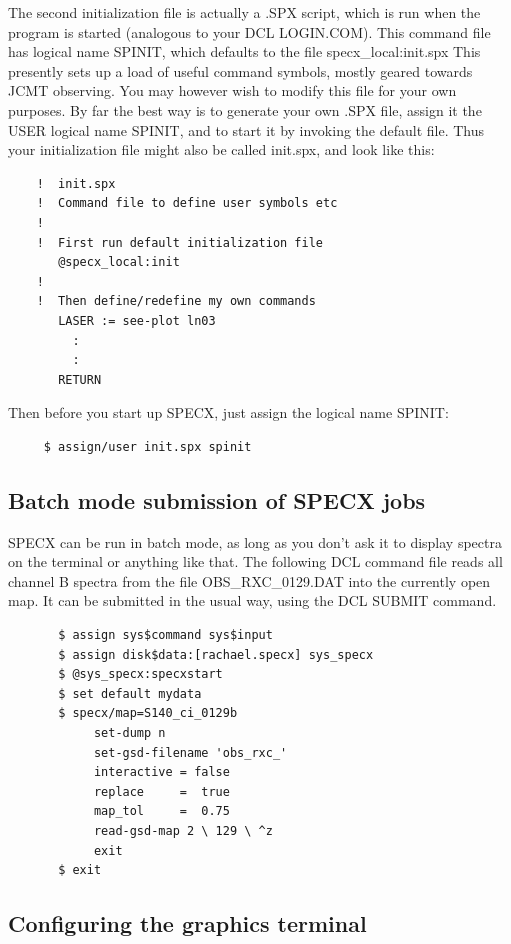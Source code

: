 \documentclass[11pt,twoside]{report}
\begin{document}
The second initialization file is actually a .SPX script, which is run
when the program is started (analogous to your DCL LOGIN.COM). This command
file has logical name SPINIT,
which defaults to the file
specx\_local:init.spx This presently sets up a load of useful command symbols,
mostly geared towards JCMT observing.
You may however wish to modify this file for your own purposes. By far the best way
is to generate your own .SPX file, assign it the USER logical name
SPINIT, and to start it by invoking the default file. Thus your
initialization file might also be called init.spx, and look like this:
\begin{verbatim}
    !  init.spx
    !  Command file to define user symbols etc
    !
    !  First run default initialization file
       @specx_local:init
    !
    !  Then define/redefine my own commands
       LASER := see-plot ln03
         :
         :
       RETURN
\end{verbatim}
Then before you start up SPECX, just assign the logical name SPINIT:
\begin{verbatim}
     $ assign/user init.spx spinit
\end{verbatim}

\subsection{Batch mode submission of SPECX jobs}

SPECX can be run in batch mode, as long as you don't ask it to display
spectra on the terminal or anything like that. The following DCL command
file reads all channel B spectra from the file OBS\_RXC\_0129.DAT into the
currently open map. It can be submitted in the usual way, using the DCL
SUBMIT command.

\begin{verbatim}
       $ assign sys$command sys$input
       $ assign disk$data:[rachael.specx] sys_specx
       $ @sys_specx:specxstart
       $ set default mydata
       $ specx/map=S140_ci_0129b
            set-dump n
            set-gsd-filename 'obs_rxc_'
            interactive = false
            replace     =  true
            map_tol     =  0.75
            read-gsd-map 2 \ 129 \ ^z
            exit
       $ exit
\end{verbatim}

\subsection{Configuring the graphics terminal}
\end{document}
